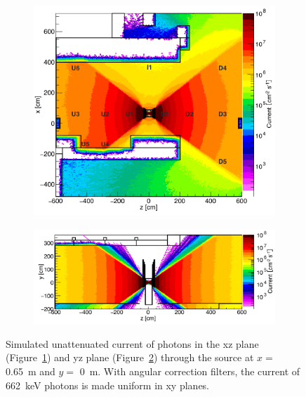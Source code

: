 	\begin{figure}[H]
		\begin{subfigure}{0.5\linewidth}
		    \centering
			\includegraphics[width = 0.6\plotwidth]{fig/chapt5/GIFpp-gCurrent-XZ.png}\\
			\caption{\label{fig:GIFpp-gCurrent:XZ}}
		\end{subfigure}
		\begin{subfigure}{0.5\linewidth}
		    \centering
			\includegraphics[width = 0.6\plotwidth]{fig/chapt5/GIFpp-gCurrent-YZ.png}
			\caption{\label{fig:GIFpp-gCurrent:YZ}}
		\end{subfigure}
		\caption{\label{fig:GIFpp-gCurrent} Simulated unattenuated current of photons in the xz plane (Figure~\ref{fig:GIFpp-gCurrent:XZ}) and yz plane (Figure~\ref{fig:GIFpp-gCurrent:YZ}) through the source at $x=$ \SI{0.65}{m} and $y=$ \SI{0}{m}. With angular correction filters, the current of \SI{662}{keV} photons is made uniform in xy planes.}
    \end{figure}
	 

